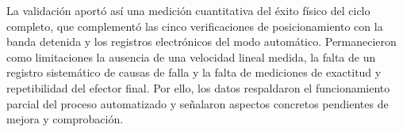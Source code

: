 La validación aportó así una medición cuantitativa del éxito físico del ciclo completo, que complementó las cinco verificaciones de posicionamiento con la banda detenida y los registros electrónicos del modo automático. Permanecieron como limitaciones la ausencia de una velocidad lineal medida, la falta de un registro sistemático de causas de falla y la falta de mediciones de exactitud y repetibilidad del efector final. Por ello, los datos respaldaron el funcionamiento parcial del proceso automatizado y señalaron aspectos concretos pendientes de mejora y comprobación.
